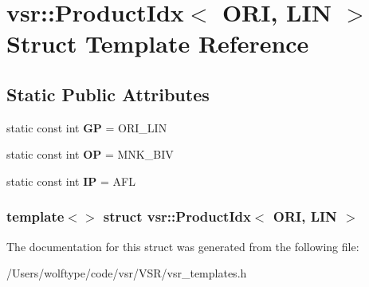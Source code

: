 \hypertarget{structvsr_1_1_product_idx_3_01_o_r_i_00_01_l_i_n_01_4}{\section{vsr\-:\-:Product\-Idx$<$ O\-R\-I, L\-I\-N $>$ Struct Template Reference}
\label{structvsr_1_1_product_idx_3_01_o_r_i_00_01_l_i_n_01_4}
}
\subsection*{Static Public Attributes}
\begin{DoxyCompactItemize}
\item 
\hypertarget{structvsr_1_1_product_idx_3_01_o_r_i_00_01_l_i_n_01_4_acb17ba2c46438cbd1695abe76680d383}{static const int {\bfseries G\-P} = O\-R\-I\-\_\-\-L\-I\-N}\label{structvsr_1_1_product_idx_3_01_o_r_i_00_01_l_i_n_01_4_acb17ba2c46438cbd1695abe76680d383}

\item 
\hypertarget{structvsr_1_1_product_idx_3_01_o_r_i_00_01_l_i_n_01_4_a0d10ae1b602d95e6bf90e2cd1fbda1b5}{static const int {\bfseries O\-P} = M\-N\-K\-\_\-\-B\-I\-V}\label{structvsr_1_1_product_idx_3_01_o_r_i_00_01_l_i_n_01_4_a0d10ae1b602d95e6bf90e2cd1fbda1b5}

\item 
\hypertarget{structvsr_1_1_product_idx_3_01_o_r_i_00_01_l_i_n_01_4_aaf7bad91a7b4c8b1a8625f4878d528d9}{static const int {\bfseries I\-P} = A\-F\-L}\label{structvsr_1_1_product_idx_3_01_o_r_i_00_01_l_i_n_01_4_aaf7bad91a7b4c8b1a8625f4878d528d9}

\end{DoxyCompactItemize}
\subsubsection*{template$<$$>$ struct vsr\-::\-Product\-Idx$<$ O\-R\-I, L\-I\-N $>$}



The documentation for this struct was generated from the following file\-:\begin{DoxyCompactItemize}
\item 
/\-Users/wolftype/code/vsr/\-V\-S\-R/vsr\-\_\-templates.\-h\end{DoxyCompactItemize}
